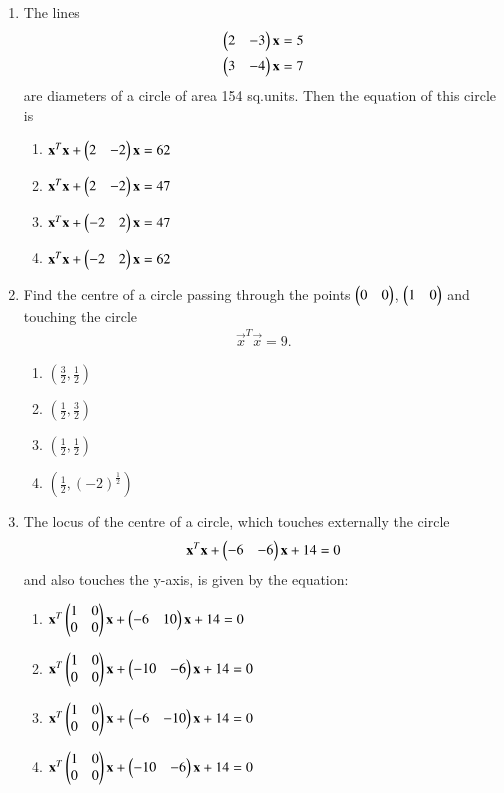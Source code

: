 \begin{enumerate}[label=\arabic*.,ref=\thesubsection.\theenumi]
\item The lines 
\begin{align}
\begin{pmatrix}2 & -3\end{pmatrix}\mathbf{x} = 5 \\
\begin{pmatrix}3 & -4\end{pmatrix}\mathbf{x} = 7
\end{align}
are diameters of a circle of area 154 sq.units. Then the equation of this circle is
\begin{enumerate}
\item $ \mathbf{x}^T\mathbf{x} + \begin{pmatrix}2 & -2\end{pmatrix}\mathbf{x} = 62$
\item $ \mathbf{x}^T\mathbf{x} + \begin{pmatrix}2 & -2\end{pmatrix}\mathbf{x} = 47$
\item $ \mathbf{x}^T\mathbf{x} + \begin{pmatrix}-2 & 2\end{pmatrix}\mathbf{x} = 47$
\item $ \mathbf{x}^T\mathbf{x} + \begin{pmatrix}-2 & 2\end{pmatrix}\mathbf{x} = 62$
\end{enumerate}

\item Find the centre of a circle passing through the points $\begin{pmatrix}0 & 0\end{pmatrix}$, $\begin{pmatrix}1 & 0\end{pmatrix}$ and touching the circle
\begin{align}
\vec{x}^T\vec{x} = 9.
\end{align}
\begin{enumerate}
\item $(\frac{3}{2}, \frac{1}{2})$
\item $(\frac{1}{2}, \frac{3}{2})$
\item $(\frac{1}{2}, \frac{1}{2})$
\item $(\frac{1}{2}, (-2)^{\frac{1}{2}})$
\end{enumerate}
     
\item The locus of the centre of a circle, which touches externally the circle 
\begin{align}
\mathbf{x}^T\mathbf{x} + \begin{pmatrix}-6 & -6\end{pmatrix}\mathbf{x} + 14 = 0
\end{align}
and also touches the y-axis, is given by the equation:
\begin{enumerate}
\item $\mathbf{x}^T \begin{pmatrix}1 & 0 \\ 0 & 0\end{pmatrix}\mathbf{x} + \begin{pmatrix}-6 & 10\end{pmatrix} \mathbf{x} + 14 = 0$
\item $\mathbf{x}^T \begin{pmatrix}1 & 0 \\ 0 & 0\end{pmatrix}\mathbf{x} + \begin{pmatrix}-10 & -6\end{pmatrix}\mathbf{x} + 14 = 0$
\item $\mathbf{x}^T \begin{pmatrix}1 & 0 \\ 0 & 0\end{pmatrix}\mathbf{x} + \begin{pmatrix}-6 & -10\end{pmatrix}\mathbf{x} + 14 = 0$
\item $\mathbf{x}^T \begin{pmatrix}1 & 0 \\ 0 & 0\end{pmatrix}\mathbf{x} + \begin{pmatrix}-10 & -6\end{pmatrix} \mathbf{x} + 14 = 0$
\end{enumerate}


\end{enumerate}
